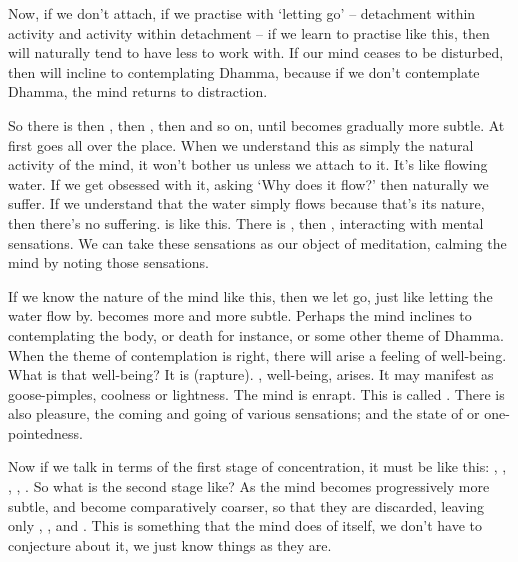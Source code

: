 Now, if we don't attach, if we practise with `letting go' -- detachment within activity and activity within detachment -- if we learn to practise like this, then  will naturally tend to have less to work with. If our mind ceases to be disturbed, then  will incline to contemplating Dhamma, because if we don't contemplate Dhamma, the mind returns to distraction. 

So there is  then ,  then ,  then  and so on, until  becomes gradually more subtle. At first  goes all over the place. When we understand this as simply the natural activity of the mind, it won't bother us unless we attach to it. It's like flowing water. If we get obsessed with it, asking `Why does it flow?' then naturally we suffer. If we understand that the water simply flows because that's its nature, then there's no suffering.  is like this. There is , then , interacting with mental sensations. We can take these sensations as our object of meditation, calming the mind by noting those sensations. 

If we know the nature of the mind like this, then we let go, just like letting the water flow by.  becomes more and more subtle. Perhaps the mind inclines to contemplating the body, or death for instance, or some other theme of Dhamma. When the theme of contemplation is right, there will arise a feeling of well-being. What is that well-being? It is  (rapture). , well-being, arises. It may manifest as goose-pimples, coolness or lightness. The mind is enrapt. This is called . There is also pleasure,  the coming and going of various sensations; and the state of  or one-pointedness.

Now if we talk in terms of the first stage of concentration, it must be like this: , , , , . So what is the second stage like? As the mind becomes progressively more subtle,  and  become comparatively coarser, so that they are discarded, leaving only , , and . This is something that the mind does of itself, we don't have to conjecture about it, we just know things as they are. 

